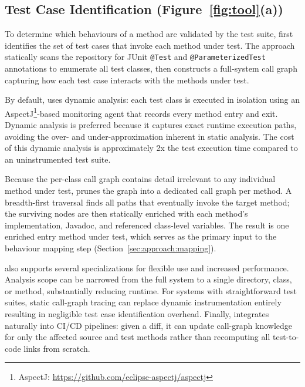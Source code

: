 \subsection{Test Case Identification (Figure~\ref{fig:tool}(a))}
\label{sec:approach:tests}

To determine which behaviours of a method are validated by the test suite, \toolname{} first identifies the set of test cases that invoke each method under test. 
The approach statically scans the repository for JUnit \texttt{@Test} and \texttt{@ParameterizedTest} annotations to enumerate all test classes, then constructs a full-system call graph capturing how each test case interacts with the methods under test.

By default, \toolname{} uses dynamic analysis: each test class is executed in isolation using an AspectJ\footnote{AspectJ: \url{https://github.com/eclipse-aspectj/aspectj}}-based monitoring agent that records every method entry and exit. 
Dynamic analysis is preferred because it captures exact runtime execution paths, avoiding the over- and under-approximation inherent in static analysis. 
The cost of this dynamic analysis is approximately 2x the test execution time compared to an uninstrumented test suite.

Because the per-class call graph contains detail irrelevant to any individual method under test, \toolname{} prunes the graph into a dedicated call graph per method. 
A breadth-first traversal finds all paths that eventually invoke the target method; the surviving nodes are then statically enriched with each method's implementation, Javadoc, and referenced class-level variables. 
The result is one enriched entry method under test, which serves as the primary input to the behaviour mapping step (Section~\ref{sec:approach:mapping}).

\toolname{} also supports several specializations for flexible use and increased performance.
Analysis scope can be narrowed from the full system to a single directory, class, or method, substantially reducing runtime. 
For systems with straightforward test suites, static call-graph tracing can replace dynamic instrumentation entirely resulting in negligible test case identification overhead.
Finally, \toolname{} integrates naturally into CI/CD pipelines: given a diff, it can update call-graph knowledge for only the affected source and test methods rather than recomputing all test-to-code links from scratch.

